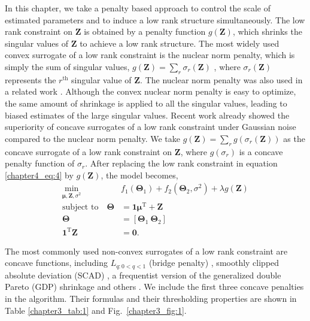 In this chapter, we take a penalty based approach to control the scale of estimated parameters and to induce a low rank structure simultaneously. The low rank constraint on $\mathbf{Z}$ is obtained by a penalty function $g(\mathbf{Z})$, which shrinks the singular values of $\mathbf{Z}$ to achieve a low rank structure. The most widely used convex surrogate of a low rank constraint is the nuclear norm penalty, which is simply the sum of singular values, $g(\mathbf{Z}) = \sum_{r} \sigma_r(\mathbf{Z})$ \cite{koltchinskii2011nuclear}, where $\sigma_r(\mathbf{Z})$ represents the $r^{\text{th}}$ singular value of $\mathbf{Z}$. The nuclear norm penalty was also used in a related work \cite{wu2015fast}. Although the convex nuclear norm penalty is easy to optimize, the same amount of shrinkage is applied to all the singular values, leading to biased estimates of the large singular values. Recent work \cite{gavish2017optimal, lu2015generalized} already showed the superiority of concave surrogates of a low rank constraint under Gaussian noise compared to the nuclear norm penalty. We take $g(\mathbf{Z}) = \sum_{r} g(\sigma_r(\mathbf{Z}))$ as the concave surrogate of a low rank constraint on $\mathbf{Z}$, where $g(\sigma_r)$ is a concave penalty function of $\sigma_r$. After replacing the low rank constraint in equation \ref{chapter4_eq:4} by $g(\mathbf{Z})$, the model becomes,
\begin{equation}\label{chapter4_eq:5}
\begin{aligned}
    \min_{\bm{\mu},\mathbf{Z},\sigma^2} \quad & f_1(\mathbf{\Theta}_1) + f_2(\mathbf{\Theta}_2,\sigma^2) + \lambda g(\mathbf{Z}) \\
    \text{subject to} \quad \mathbf{\Theta} &= \mathbf{1}\bm{\mu}^{\text{T}} + \mathbf{Z} \\
     \mathbf{\Theta} &= [\mathbf{\Theta}_1 ~ \mathbf{\Theta}_2] \\
     \mathbf{1}^{\text{T}}\mathbf{Z} &= \mathbf{0}.
\end{aligned}
\end{equation}

The most commonly used non-convex surrogates of a low rank constraint are concave functions, including $L_{q:0 < q < 1}$ (bridge penalty) \cite{fu1998penalized,liu2007support}, smoothly clipped absolute deviation (SCAD) \cite{fan2001variable}, a frequentist version of the generalized double Pareto (GDP) shrinkage \cite{armagan2013generalized} and others \cite{lu2015generalized}. We include the first three concave penalties in the algorithm. Their formulas and their thresholding properties are shown in Table \ref{chapter3_tab:1} and Fig.~\ref{chapter3_fig:1}.

